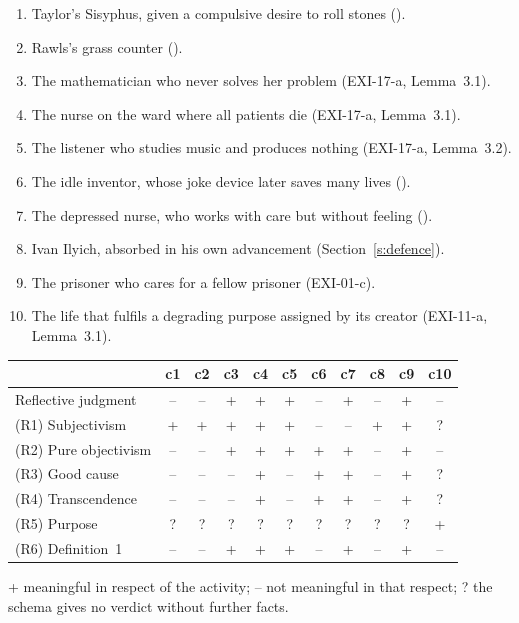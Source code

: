 \begin{enumerate}[label=(c\arabic*)]
\item Taylor's Sisyphus, given a compulsive desire to roll stones ().
\item Rawls's grass counter ().
\item The mathematician who never solves her problem (EXI-17-a, Lemma~3.1).
\item The nurse on the ward where all patients die (EXI-17-a, Lemma~3.1).
\item The listener who studies music and produces nothing (EXI-17-a, Lemma~3.2).
\item The idle inventor, whose joke device later saves many lives ().
\item The depressed nurse, who works with care but without feeling ().
\item Ivan Ilyich, absorbed in his own advancement (Section~\ref{s:defence}).
\item The prisoner who cares for a fellow prisoner (EXI-01-c).
\item The life that fulfils a degrading purpose assigned by its creator (EXI-11-a, Lemma~3.1).
\end{enumerate}

\begin{center}\small
\begin{tabular}{@{}l c c c c c c c c c c@{}}
\toprule
 & c1 & c2 & c3 & c4 & c5 & c6 & c7 & c8 & c9 & c10 \\
\midrule
Reflective judgment & -- & -- & + & + & + & -- & + & -- & + & -- \\
\midrule
(R1) Subjectivism & + & + & + & + & + & -- & -- & + & + & ? \\
(R2) Pure objectivism & -- & -- & + & + & + & + & + & -- & + & -- \\
(R3) Good cause & -- & -- & -- & + & -- & + & + & -- & + & ? \\
(R4) Transcendence & -- & -- & -- & + & -- & + & + & -- & + & ? \\
(R5) Purpose & ? & ? & ? & ? & ? & ? & ? & ? & ? & + \\
(R6) Definition~1 & -- & -- & + & + & + & -- & + & -- & + & -- \\
\bottomrule
\end{tabular}

\smallskip
{\footnotesize + meaningful in respect of the activity; -- not meaningful in that respect; ? the schema gives no verdict without further facts.}
\end{center}

